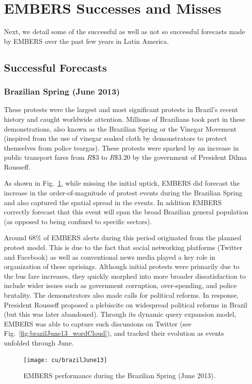\section{EMBERS Successes and Misses}
\label{sec:success}
Next, we detail
some of the successful as well as not so successful forecasts made by EMBERS over
the past few years in Latin America.
\subsection{Successful Forecasts}
\subsubsection*{Brazilian Spring (June 2013)}
These protests were the largest and most
significant protests in Brazil's recent history and caught worldwide
attention. Millions of Brazilians took part in these demonstrations,
also known as the Brazilian Spring or the Vinegar Movement (inspired
from the use of vinegar soaked cloth by demonstrators to protect
themselves from police teargas). These protests were
sparked by an increase in public transport fares from $R\$3$
to $R\$3.20$ by the government of President Dilma Rousseff.

As shown in Fig.~\ref{fig:brazilJune13}, while missing the initial uptick,
EMBERS did forecast the increase in the order-of-magnitude of protest events
during the Brazilian Spring and also captured
the spatial spread in the events. In addition EMBERS correctly
forecast that this event
will span the broad Brazilian general population (as opposed to being confined to
specific sectors).

Around 68\% of EMBERS alerts during this period originated from
the planned protest model.
This is due to the fact that
social networking
platforms (Twitter and Facebook) as well as conventional news media played a key
role in organization of these uprisings. Although initial protests were
primarily due to the bus fare increases, they quickly morphed into
more broader dissatisfaction to include wider issues such as
government corruption, over-spending, and police brutality. The
demonstrators also made calls for political reforms. In response, President
Rousseff proposed a plebiscite on widespread political reforms in
Brazil (but this was later abandoned). Through its dynamic query expansion model,
EMBERS was able to capture such discussions on Twitter
(see Fig.~\ref{fig:brazilJune13_wordCloud}), and tracked their evolution as events
unfolded through June.
\begin{figure} %
\centering
\texttt{[image: cu/brazilJune13]}
\caption{EMBERS performance during the Brazilian Spring (June 2013).}
\label{fig:brazilJune13}
\end{figure}

